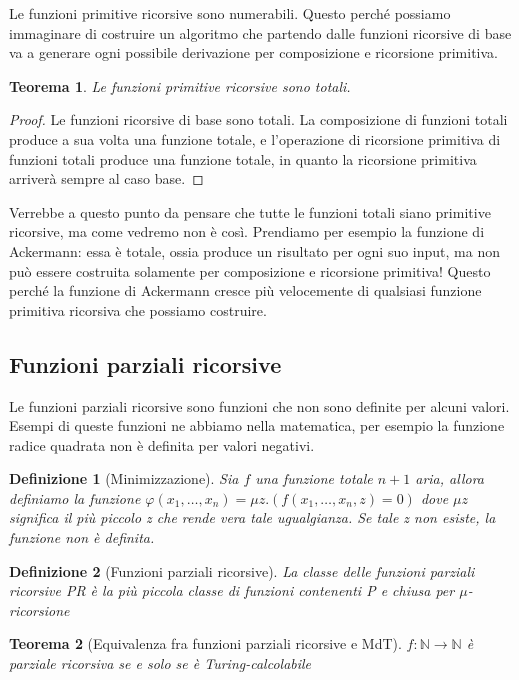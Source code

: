 \documentclass[a4paper,titlepage]{article}
\newtheorem{theorem}{Teorema}[section]
\newtheorem{definition}{Definizione}[section]
\theoremstyle{definition}
\newcommand{\N}{\mathbb{N}}
\begin{document}
Le funzioni primitive ricorsive sono numerabili. Questo perché possiamo immaginare di costruire un algoritmo che partendo dalle funzioni ricorsive di base va a generare ogni possibile derivazione per composizione e ricorsione primitiva. 

\begin{theorem}
	Le funzioni primitive ricorsive sono totali. 
\end{theorem}
\begin{proof}
	Le funzioni ricorsive di base sono totali. La composizione di funzioni totali produce a sua volta una funzione totale, e l'operazione di ricorsione primitiva di funzioni totali produce una funzione totale, in quanto la ricorsione primitiva arriverà sempre al caso base. 
\end{proof}

Verrebbe a questo punto da pensare che tutte le funzioni totali siano primitive ricorsive, ma come vedremo non è così. Prendiamo per esempio la funzione di Ackermann: essa è totale, ossia produce un risultato per ogni suo input, ma non può essere costruita solamente per composizione e ricorsione primitiva! Questo perché la funzione di Ackermann cresce più velocemente di qualsiasi funzione primitiva ricorsiva che possiamo costruire. 

\subsection{Funzioni parziali ricorsive}
Le funzioni parziali ricorsive sono funzioni che non sono definite per alcuni valori. Esempi di queste funzioni ne abbiamo nella matematica, per esempio la funzione radice quadrata non è definita per valori negativi. 

\begin{definition}[Minimizzazione]
	Sia $f$ una funzione totale $n+1$ aria, allora definiamo la funzione $\varphi(x_1,\dots,x_n) = \mu z.(f(x_1,\dots,x_n,z) = 0)$ dove $\mu z$ significa il più piccolo z che rende vera tale ugualgianza. Se tale z non esiste, la funzione non è definita. 
\end{definition}

\begin{definition}[Funzioni parziali ricorsive]
	La classe delle funzioni parziali ricorsive PR è la più piccola classe di funzioni contenenti P e chiusa per $\mu$-ricorsione
\end{definition}

\begin{theorem}[Equivalenza fra funzioni parziali ricorsive e MdT]
	$f:\N\longrightarrow\N$ è parziale ricorsiva se e solo se è Turing-calcolabile
\end{theorem}
\end{document}
